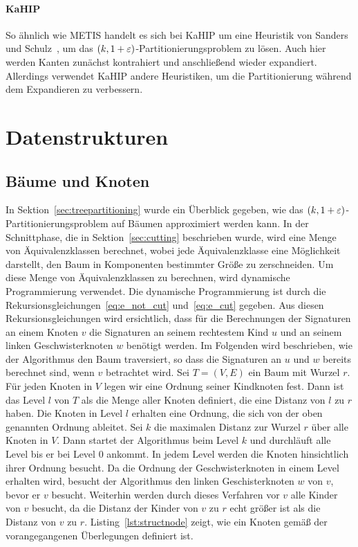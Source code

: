 \paragraph{KaHIP}
So ähnlich wie METIS handelt es sich bei KaHIP um eine Heuristik von Sanders und Schulz~\cite{SS13}, um das $(k, 1 + \varepsilon)$\hyp Partitionierungsproblem zu lösen.
Auch hier werden Kanten zunächst kontrahiert und anschließend wieder expandiert.
Allerdings verwendet KaHIP andere Heuristiken, um die Partitionierung während dem Expandieren zu verbessern.

\section{Datenstrukturen}
\subsection{Bäume und Knoten}
In Sektion~\ref{sec:treepartitioning} wurde ein Überblick gegeben, wie das $(k,1+\varepsilon)$\hyp Partitionierungsproblem auf Bäumen approximiert werden kann. 
In der Schnittphase, die in Sektion~\ref{sec:cutting} beschrieben wurde, wird eine Menge von Äquivalenzklassen berechnet, wobei jede Äquivalenzklasse eine Möglichkeit darstellt, den Baum in Komponenten bestimmter Größe zu zerschneiden.
Um diese Menge von Äquivalenzklassen zu berechnen, wird dynamische Programmierung verwendet.
Die dynamische Programmierung ist durch die Rekursionsgleichungen~\eqref{eq:e_not_cut} und~\eqref{eq:e_cut} gegeben.
Aus diesen Rekursionsgleichungen wird ersichtlich, dass für die Berechnungen der Signaturen an einem Knoten $v$ die Signaturen an seinem rechtestem Kind $u$ und an seinem linken Geschwisterknoten $w$ benötigt werden.
Im Folgenden wird beschrieben, wie der Algorithmus den Baum traversiert, so dass die Signaturen an $u$ und $w$ bereits berechnet sind, wenn $v$ betrachtet wird. 
Sei $T=(V,E)$ ein Baum mit Wurzel $r$.
Für jeden Knoten in $V$ legen wir eine Ordnung seiner Kindknoten fest.
 Dann ist das Level $l$ von $T$ als die Menge aller Knoten definiert, die eine Distanz von $l$ zu $r$ haben. 
Die Knoten in Level $l$ erhalten eine Ordnung, die sich von der oben genannten Ordnung ableitet.
Sei $k$ die maximalen Distanz zur Wurzel $r$ über alle Knoten in $V$.
Dann startet der Algorithmus beim Level $k$ und durchläuft alle Level bis er bei Level $0$ ankommt.
In jedem Level werden die Knoten hinsichtlich ihrer Ordnung besucht.
Da die Ordnung der Geschwisterknoten in einem Level erhalten wird, besucht der Algorithmus den linken Geschisterknoten $w$ von $v$, bevor er $v$ besucht.
Weiterhin werden durch dieses Verfahren vor $v$ alle Kinder von $v$ besucht, da die Distanz der Kinder von $v$ zu $r$ echt größer ist als die Distanz von $v$ zu $r$.
Listing~\ref{lst:structnode} zeigt, wie ein Knoten gemäß der vorangegangenen Überlegungen definiert ist.

